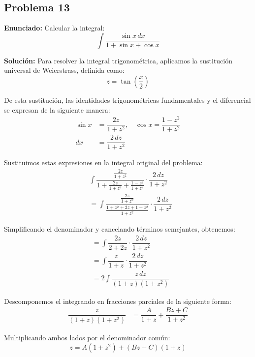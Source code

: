 \subsection*{Problema 13}

\textbf{Enunciado:} Calcular la integral:
\begin{equation*}
\int \frac{\sin x \, dx}{1 + \sin x + \cos x}
\end{equation*}

\textbf{Solución:} Para resolver la integral trigonométrica, aplicamos la sustitución universal de Weierstrass, definida como:
\begin{equation*}
z = \tan\left(\frac{x}{2}\right)
\end{equation*}

De esta sustitución, las identidades trigonométricas fundamentales y el diferencial se expresan de la siguiente manera:
\begin{align*}
\sin x &= \dfrac{2z}{1 + z^2}, \quad 
\cos x = \dfrac{1 - z^2}{1 + z^2} \\
dx &= \dfrac{2 \, dz}{1 + z^2}
\end{align*}

Sustituimos estas expresiones en la integral original del problema:
\begin{align*}
&\int \dfrac{\frac{2z}{1 + z^2}}{1 + \frac{2z}{1 + z^2} + \frac{1 - z^2}{1 + z^2}} \cdot \dfrac{2 \, dz}{1 + z^2} \\
&= \int \dfrac{\frac{2z}{1 + z^2}}{\frac{1 + z^2 + 2z + 1 - z^2}{1 + z^2}} \cdot \dfrac{2 \, dz}{1 + z^2}
\end{align*}

Simplificando el denominador y cancelando términos semejantes, obtenemos:
\begin{align*}
&= \int \dfrac{2z}{2 + 2z} \cdot \dfrac{2 \, dz}{1 + z^2} \\
&= \int \dfrac{z}{1 + z} \cdot \dfrac{2 \, dz}{1 + z^2} \\
&= 2 \int \dfrac{z \, dz}{(1 + z)(1 + z^2)}
\end{align*}

Descomponemos el integrando en fracciones parciales de la siguiente forma:
\begin{align*}
\dfrac{z}{(1 + z)(1 + z^2)} &= \dfrac{A}{1 + z} + \dfrac{Bz + C}{1 + z^2}
\end{align*}

Multiplicando ambos lados por el denominador común:
\begin{equation*}
z = A(1 + z^2) + (Bz + C)(1 + z)
\end{equation*}

